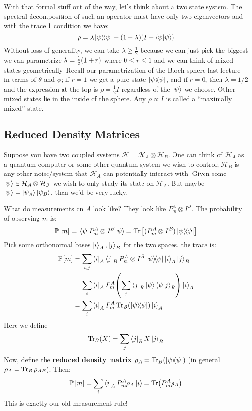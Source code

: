 With that formal stuff out of the way, let's think about a two state system. The spectral decomposition
of such an operator must have only two eigenvectors and with the trace 1 condition we have:
\[ \rho = \lambda \ketbra{\psi}{\psi} + (1 - \lambda)(I - \braket{\psi}{\psi}) \]
Without loss of generality, we can take $\lambda \geq \frac{1}{2}$ because we can just pick the biggest
we can parametrize $\lambda = \frac{1}{2} \qty(1 + r)$ where $0 \leq r \leq 1$ and we can think of
mixed states geometrically. Recall our parametrization of the Bloch sphere last lecture in terms of $\theta$ and $\phi$;
if $r = 1$ we get a pure state $\ketbra{\psi}{\psi}$, and if $r = 0$, then $\lambda = 1/2$ and the expression at the top is $\rho = \frac{1}{2} I$
regardless of the $\ket{\psi}$ we choose. Other mixed states lie in the inside of the sphere. Any $\rho \propto I$ is called a
``maximally mixed'' state.

\subsection{Reduced Density Matrices}
Suppose you have two coupled systems $\mathcal{H} = \mathcal{H}_A \otimes \mathcal{H}_B$. One can think
of $\mathcal{H}_A$ as a quantum computer or some other quantum system we wish to control; $\mathcal{H}_B$ is any other
noise/system that $\mathcal{H}_A$ can potentially interact with. Given some $\ket{\psi} \in \mathcal{H}_A \otimes \mathcal{H}_B$
we wish to only study its state on $\mathcal{H}_A$. But maybe $\ket{\psi} = \ket{\psi_A} \ket{\psi_B}$, then we'd be very lucky.

What do measurements on $A$ look like? They look like $P_m^{A} \otimes I^B$. The probability of observing $m$ is:
\[ \mathbb{P}\left[ m \right] = \mel{\psi}{P_m^A \otimes I^B}{\psi} = \Tr\qty[(P_m^A \otimes I^B) \ketbra{\psi}{\psi}] \]
Pick some orthonormal bases $\ket{i}_A, \ket{j}_B$ for the two spaces. the trace is:
\begin{align*}
    \mathbb{P}\left[ m \right] &= \sum_{i, j} \bra{i}_A \bra{j}_B P_m^A \otimes I^B \ketbra{\psi}{\psi} \ket{i}_A \ket{j}_B \\
    &= \sum_{i} \bra{i}_A P_m^A \qty(\sum_j \bra{j}_B\ket{\psi} \bra{\psi} \ket{j}_B) \ket{i}_A \\
    &= \sum_{i} \bra{i}_A P_m^A \Tr_B(\ketbra{\psi}{\psi}) \ket{i}_A
\end{align*}
Here we define 
\[ \Tr_B(X) = \sum_j \bra{j}_B X \ket{j}_B \]
Now, define the \textbf{reduced density matrix} $\rho_A = \Tr_B(\ketbra{\psi}{\psi})$ (in general $\rho_A = \Tr_B \rho_{AB}$). Then:
\[ \mathbb{P}\left[ m \right] = \sum_i \bra{i}_A P_m^A \rho_A \ket{i} = \Tr(P_m^A \rho_A) \]
This is exactly our old measurement rule!

